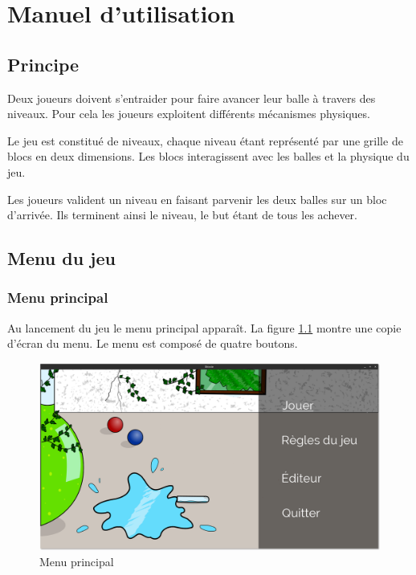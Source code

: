 \chapter{Manuel d'utilisation}

\section{Principe}

Deux joueurs doivent s'entraider pour faire avancer leur balle à travers
des niveaux. Pour cela les joueurs exploitent différents mécanismes
physiques.

Le jeu est constitué de niveaux, chaque niveau étant représenté par une
grille de blocs en deux dimensions. Les blocs interagissent avec les
balles et la physique du jeu.

Les joueurs valident un niveau en faisant parvenir les deux balles sur
un bloc d'arrivée. Ils terminent ainsi le niveau, le but étant de tous
les achever.

\section{Menu du jeu}

\subsection{Menu principal}

Au lancement du jeu le menu principal apparaît. La figure
\ref{fig:manuel-menu-principal} montre une copie d'écran du menu.
Le menu est composé de quatre boutons.

\begin{figure}[h]
    \centering
    \includegraphics[width=13cm]{figures/manuel-menu-principal.png}
    \caption{Menu principal}
    \label{fig:manuel-menu-principal}
\end{figure}

